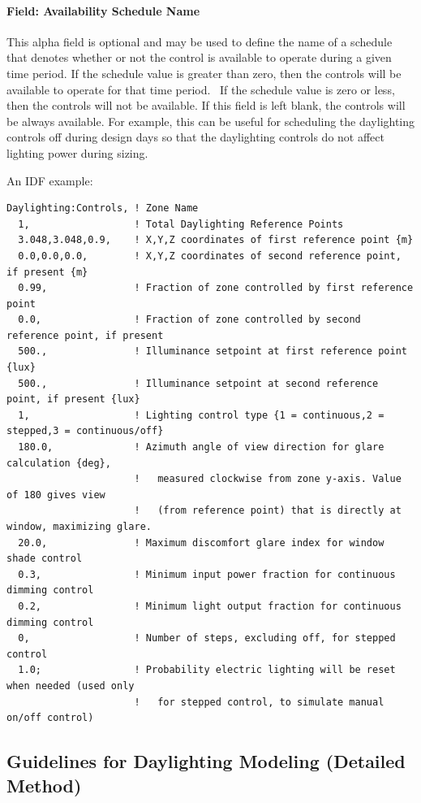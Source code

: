 \paragraph{Field: Availability Schedule Name}\label{field-availability-schedule-name-002}

This alpha field is optional and may be used to define the name of a schedule that denotes whether or not the control is available to operate during a given time period. If the schedule value is greater than zero, then the controls will be available to operate for that time period.~ If the schedule value is zero or less, then the controls will not be available. If this field is left blank, the controls will be always available. For example, this can be useful for scheduling the daylighting controls off during design days so that the daylighting controls do not affect lighting power during sizing.

An IDF example:

\begin{lstlisting}
Daylighting:Controls, ! Zone Name
  1,                  ! Total Daylighting Reference Points
  3.048,3.048,0.9,    ! X,Y,Z coordinates of first reference point {m}
  0.0,0.0,0.0,        ! X,Y,Z coordinates of second reference point, if present {m}
  0.99,               ! Fraction of zone controlled by first reference point
  0.0,                ! Fraction of zone controlled by second reference point, if present
  500.,               ! Illuminance setpoint at first reference point {lux}
  500.,               ! Illuminance setpoint at second reference point, if present {lux}
  1,                  ! Lighting control type {1 = continuous,2 = stepped,3 = continuous/off}
  180.0,              ! Azimuth angle of view direction for glare calculation {deg},
                      !   measured clockwise from zone y-axis. Value of 180 gives view
                      !   (from reference point) that is directly at window, maximizing glare.
  20.0,               ! Maximum discomfort glare index for window shade control
  0.3,                ! Minimum input power fraction for continuous dimming control
  0.2,                ! Minimum light output fraction for continuous dimming control
  0,                  ! Number of steps, excluding off, for stepped control
  1.0;                ! Probability electric lighting will be reset when needed (used only
                      !   for stepped control, to simulate manual on/off control)
\end{lstlisting}

\subsection{Guidelines for Daylighting Modeling (Detailed Method)}\label{guidelines-for-daylighting-modeling-detailed-method}

